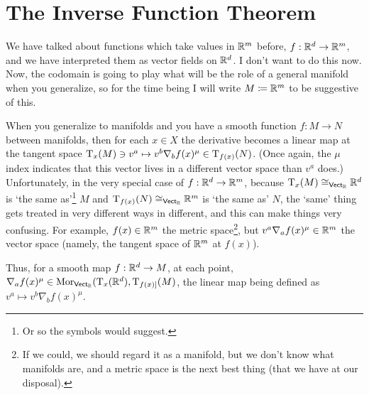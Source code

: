 \section{The Inverse Function Theorem}

We have talked about functions which take values in $\R ^m$ before, $f:\R ^d\rightarrow \R ^m$, and we have interpreted them as vector fields on $\R ^d$.  I don't want to do this now.  Now, the codomain is going to play what will be the role of a general manifold when you generalize, so for the time being I will write $M\coloneqq \R ^m$ to be suggestive of this.
\begin{displayquote}
When you generalize to manifolds and you have a smooth function $f:M\rightarrow N$ between manifolds, then for each $x\in X$ the derivative becomes a linear map at the tangent space $\tangent{M}{x}\ni v^a\mapsto v^b\nabla _bf(x)^\mu \in \tangent{N}{f(x)}$.  (Once again, the $\mu$ index indicates that this vector lives in a different vector space than $v^a$ does.)  Unfortunately, in the very special case of $f:\R ^d\rightarrow \R ^m$, because $\tangent{M}{x}\cong _{\Vect _{\R}}\R ^d$ is `the same as'\footnote{Or so the symbols would suggest.} $M$ and $\tangent{N}{f(x)}\cong _{\Vect _{\R}}\R ^m$ is `the same as' $N$, the `same' thing gets treated in very different ways in different, and this can make things very confusing.  For example, $f(x)\in \R ^m$ the metric space\footnote{If we could, we should regard it as a manifold, but we don't know what manifolds are, and a metric space is the next best thing (that we have at our disposal).}, but $v^a\nabla _af(x)^\mu \in \R ^m$ the vector space (namely, the tangent space of $\R ^m$ at $f(x)$).
\end{displayquote}
Thus, for a smooth map $f:\R ^d\rightarrow M$, at each point, $\nabla _af(x)^\mu \in \Mor _{\Vect _{\R}}(\tangent{\R ^d}{x},\tangent{M}{f(x)]}$, the linear map being defined as $v^a\mapsto v^b\nabla _bf(x)^\mu$.

